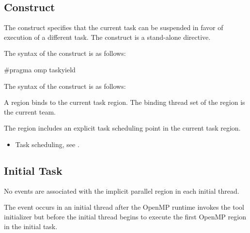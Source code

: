 \subsection{ Construct}
\label{subsec:taskyield Construct}
\summary
The  construct specifies that the current task can be 
suspended in favor of execution of a different task. The  
construct is a stand-alone directive.

\syntax
\begin{ccppspecific}
The syntax of the  construct is as follows:

\begin{ompcPragma}
#pragma omp taskyield 
\end{ompcPragma}
\end{ccppspecific}

\begin{fortranspecific}
The syntax of the  construct is as follows:

\end{fortranspecific}

\binding
A  region binds to the current task region. The binding thread 
set of the  region is the current team.

\descr
The  region includes an explicit task scheduling point in the 
current task region.

\crossreferences
\begin{itemize}
\item Task scheduling, see
.
\end{itemize}



\subsection{Initial Task}
\label{subsec:Initial Task}

\events
No events are associated with the implicit parallel region in each initial thread.

The  event occurs in an initial thread after the OpenMP 
runtime invokes the tool initializer but before the initial thread begins to execute 
the first OpenMP region in the initial task.

